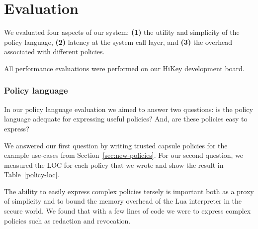 \chapter{Evaluation}
\label{sec:eval}

We evaluated four aspects of our system: \textbf{(1)} the utility and
simplicity of the policy language, %
\textbf{(2)} latency at the system call layer,
and \textbf{(3)} the overhead associated with different policies. %

All performance evaluations were performed on our HiKey development board. 

 
\subsection{Policy language}

In our policy language evaluation we aimed to answer two questions: is
the policy language adequate for expressing useful policies? And, are
these policies easy to express?

We answered our first question by writing trusted capsule policies for
the example use-cases from Section~\ref{sec:new-policies}. For our second
question, we measured the LOC for each policy that we wrote and show
the result in Table~\ref{policy-loc}.

The ability to easily express complex policies tersely is important
both as a proxy of simplicity and to bound the memory overhead of the
Lua interpreter in the secure world. We found that with a few lines of
code we were to express complex policies such as redaction and
revocation.


